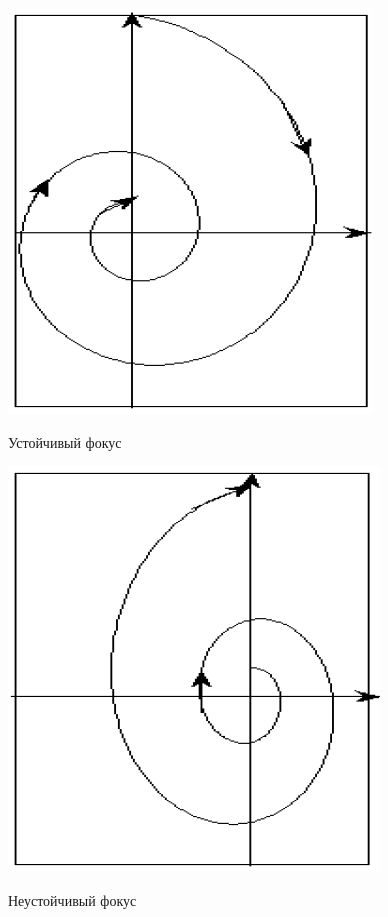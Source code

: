 	\begin{figure}[H]
		\centering
		\begin{minipage}[b]{0.49\linewidth}
			\centering
			\includegraphics[width=0.7\linewidth]{img/3_05}
			\par
			\small Устойчивый фокус
		\end{minipage}
		\hfill
		\begin{minipage}[b]{0.49\linewidth}
			\centering
			\includegraphics[width=0.7\linewidth]{img/3_06}
			\par
			\small Неустойчивый фокус
		\end{minipage}
	\end{figure}
	
